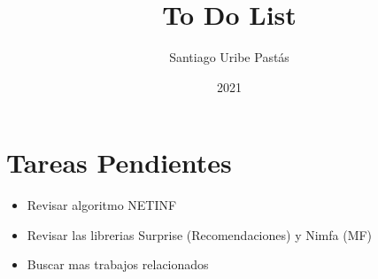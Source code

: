 \documentclass{article}
\title{To Do List}
\author{Santiago Uribe Pastás}
\date{2021}
\begin{document}
\maketitle

\section{Tareas Pendientes}
\begin{itemize}
    \item Revisar algoritmo NETINF
    \item Revisar las librerias Surprise (Recomendaciones) y Nimfa (MF)
    \item Buscar mas trabajos relacionados
\end{itemize}
\end{document}
